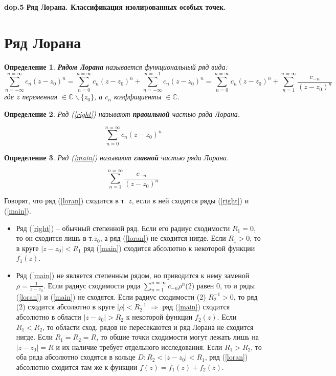 \documentclass{article}
\newtheorem{definition}{Определение}
\begin{document}
\noindent\textbf{\LARGE dop.5 Ряд Лоpана. Классификация изолиpованных особых точек.}
\section{Ряд Лорана}
\begin{definition}
\textbf{Рядом Лорана} называется функциональный ряд вида:
\begin{equation}
    \sum_{n=-\infty}^{n=\infty}c_n(z-z_0)^n=\sum_{n=0}^{n=\infty}c_n(z-z_0)^n + \sum_{n=-\infty}^{n=-1}c_{n}(z-z_0)^n = \sum_{n=0}^{n=\infty}c_n(z-z_0)^n + \sum_{n=1}^{n=\infty}\frac{c_{-n}}{(z-z_0)^n}
    \label{loran}
\end{equation}
где $z$ переменная $\in \mathbb{C}\backslash\{z_0\}$, а $c_n$ коэффициенты $\in \mathbb{C}$.
\end{definition}

\begin{definition}
Ряд (\ref{right}) называют \textbf{правильной} частью ряда Лорана.
\end{definition}
\begin{equation}
    \sum_{n=0}^{n=\infty}c_n(z-z_0)^n
    \label{right}
\end{equation}

\begin{definition}
Ряд (\ref{main}) называют \textbf{главной} частью ряда Лорана.
\end{definition}
\begin{equation}
    \sum_{n=1}^{n=\infty}\frac{c_{-n}}{(z-z_0)^n}
    \label{main}
\end{equation}

\noindent Говорят, что ряд (\ref{loran}) сходится в т. $z$, если в ней сходятся ряды (\ref{right}) и (\ref{main}).

\begin{itemize}
    \item Ряд (\ref{right})  -- обычный степенной ряд. Если его радиус сходимости $R_1=0$, то он сходится лишь в т.$z_0$, а ряд (\ref{loran}) не сходится нигде. Если $R_1>0$, то в круге $|z-z_0|<R_1$ ряд (\ref{main}) сходится абсолютно к некоторой функции $f_1(z)$.
    
    \item Ряд (\ref{main}) не является степенным рядом, но приводится к нему заменой $\rho = \frac{1}{z-z_0}$. Если радиус сходимости ряда $\sum_{n=1}^{n=\infty}c_{-n}\rho^n$(2) равен 0, то и ряды (\ref{loran}) и (\ref{main}) не сходятся. Если радиус сходимости (2) $R^{-1}_2 > 0$, то ряд (2) сходится абсолютно в круге $|\rho|<R^{-1}_2$ $\Rightarrow$ ряд (\ref{main}) сходится абсолютно в области $|z-z_0|>R_2$  к некоторой функции $f_2(z)$. Если $R_1<R_2$, то области сход. рядов не пересекаются и ряд Лорана не сходится нигде. Если $R_1=R_2=R$, то общие точки сходимости могут лежать лишь на $|z-z_0|=R$ и их наличие требует отдельного исследования. Если $R_1>R_2$, то оба ряда абсолютно сходятся в кольце $D: R_2<|z-z_0|<R_1$, ряд (\ref{loran}) абсолютно сходится там же к функции $f(z) = f_1(z)+f_2(z)$.
\end{itemize}
\end{document}
